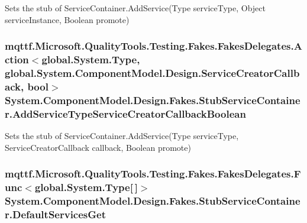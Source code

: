 Sets the stub of Service\-Container.\-Add\-Service(\-Type service\-Type, Object service\-Instance, Boolean promote)

\hypertarget{class_system_1_1_component_model_1_1_design_1_1_fakes_1_1_stub_service_container_a65bff657445d519f4c79992e43673cb3}{
\subsubsection[{Add\-Service\-Type\-Service\-Creator\-Callback\-Boolean}]{\setlength{\rightskip}{0pt plus 5cm}mqttf.\-Microsoft.\-Quality\-Tools.\-Testing.\-Fakes.\-Fakes\-Delegates.\-Action$<$global.\-System.\-Type, global.\-System.\-Component\-Model.\-Design.\-Service\-Creator\-Callback, bool$>$ System.\-Component\-Model.\-Design.\-Fakes.\-Stub\-Service\-Container.\-Add\-Service\-Type\-Service\-Creator\-Callback\-Boolean}}\label{class_system_1_1_component_model_1_1_design_1_1_fakes_1_1_stub_service_container_a65bff657445d519f4c79992e43673cb3}


Sets the stub of Service\-Container.\-Add\-Service(\-Type service\-Type, Service\-Creator\-Callback callback, Boolean promote)

\hypertarget{class_system_1_1_component_model_1_1_design_1_1_fakes_1_1_stub_service_container_ad76e981f01a03300f77aa35a7f4bd96b}{
\subsubsection[{Default\-Services\-Get}]{\setlength{\rightskip}{0pt plus 5cm}mqttf.\-Microsoft.\-Quality\-Tools.\-Testing.\-Fakes.\-Fakes\-Delegates.\-Func$<$global.\-System.\-Type\mbox{[}$\,$\mbox{]}$>$ System.\-Component\-Model.\-Design.\-Fakes.\-Stub\-Service\-Container.\-Default\-Services\-Get}}\label{class_system_1_1_component_model_1_1_design_1_1_fakes_1_1_stub_service_container_ad76e981f01a03300f77aa35a7f4bd96b}


